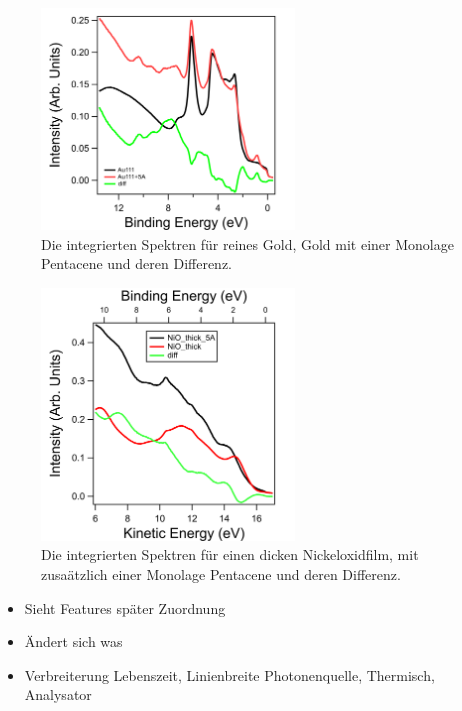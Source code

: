         \begin{figure}
            \centering
            \includegraphics[width=0.6\textwidth]{./content/pictures/EDC_Au_5A.png}
            \caption{Die integrierten Spektren für reines Gold, Gold mit einer Monolage Pentacene und deren Differenz.}
            \label{fig:Au+5A}
        \end{figure}

        \begin{figure}
            \centering
            \includegraphics[width=0.6\textwidth]{./content/pictures/NiO_thick_5A.png}
            \caption{Die integrierten Spektren für einen dicken Nickeloxidfilm, mit zusaätzlich einer Monolage Pentacene und deren Differenz.}
            \label{fig:NiO+5A}
        \end{figure}

        \begin{itemize}
            \item Sieht Features später Zuordnung
            \item Ändert sich was
            \item Verbreiterung Lebenszeit, Linienbreite Photonenquelle, Thermisch, Analysator
        \end{itemize}


